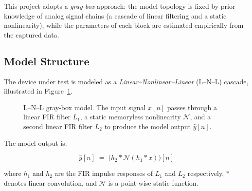 \documentclass[11pt, letterpaper]{article}
\begin{document}
This project adopts a \emph{gray-box} approach: the model topology is fixed by
prior knowledge of analog signal chains (a cascade of linear filtering and a
static nonlinearity), while the parameters of each block are estimated
empirically from the captured data.

\subsection{Model Structure}
\label{sec:lnl_structure}

The device under test is modeled as a \emph{Linear--Nonlinear--Linear} (L--N--L)
cascade, illustrated in Figure~\ref{fig:lnl_diagram}.

\begin{figure}[H]
\centering
{}
\caption{L--N--L gray-box model. The input signal $x[n]$ passes through a
linear FIR filter $L_1$, a static memoryless nonlinearity $\mathcal{N}$,
and a second linear FIR filter $L_2$ to produce the model output
$\hat{y}[n]$.}
\label{fig:lnl_diagram}
\end{figure}

The model output is:

\begin{equation}
    \hat{y}[n] \;=\; \bigl(h_2 * \mathcal{N}(h_1 * x)\bigr)[n]
    \label{eq:lnl}
\end{equation}

where $h_1$ and $h_2$ are the FIR impulse responses of $L_1$ and $L_2$
respectively, $*$ denotes linear convolution, and $\mathcal{N}$ is a
point-wise static function.
\end{document}
